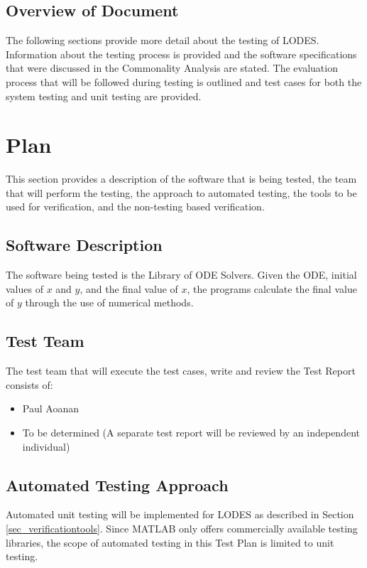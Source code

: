 \documentclass[12pt, titlepage]{article}
\newcommand{\famname}{LODES} %
\newcommand{\famdesc}{Library of ODE Solvers}
\begin{document}
\subsection{Overview of Document}
The following sections provide more detail about the testing of \famname{}.
Information about the testing process is provided and the software specifications
that were discussed in the Commonality Analysis are stated.
The evaluation process that will be followed during testing is outlined and test cases
for both the system testing and unit testing are provided.

\section{Plan}
This section provides a description of the software that is being tested, the team that will
perform the testing, the approach to automated testing, the tools to be used for verification, and the non-testing
based verification. 
	
\subsection{Software Description}
The software being tested is the \famdesc{}. Given the ODE, initial values of $x$ and $y$, and the final value of $x$,
the programs calculate the final value of $y$ through the use of numerical methods.

\subsection{Test Team}

The test team that will execute the test cases, write and review the Test Report consists of:
\begin{itemize}
 \item Paul Aoanan
 \item To be determined (A separate test report will be reviewed by an independent individual)
\end{itemize} 

\subsection{Automated Testing Approach}
Automated unit testing will be implemented for \famname{} as described in Section \ref{sec_verificationtools}.
Since MATLAB only offers commercially available testing libraries, the scope of automated testing in this Test
Plan is limited to unit testing.
\end{document}
